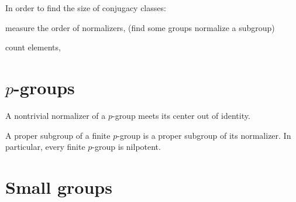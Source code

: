 \documentclass{../note}
\begin{document}
In order to find the size of conjugacy classes:
\begin{parts}
\item measure the order of normalizers, (find some groups normalize a subgroup)
\item count elements,
\end{parts}

\section{$p$-groups}


\begin{prb}[$p$-groups]
\begin{parts}
\item A nontrivial normalizer of a $p$-group meets its center out of identity.
\item A proper subgroup of a finite $p$-group is a proper subgroup of its normalizer. In particular, every finite $p$-group is nilpotent.
\end{parts}
\end{prb}


\section{Small groups}

\begin{prb}
\end{prb}

\begin{prb}
\end{prb}

\begin{prb}
\end{prb}
\end{document}
